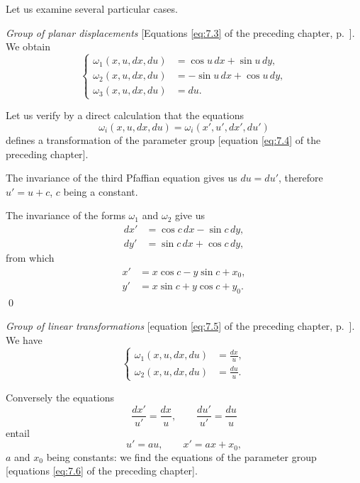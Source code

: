 \documentclass[leqno,11pt]{book}
\numberwithin{equation}{chapter}
\theoremstyle{shape1}
\theoremstyle{shapesmall}
\newcommand{\somespace}{\vspace{9pt}}
\begin{document}
{\small

Let us examine several particular cases.

\somespace

\emph{Group of planar displacements} [Equations \eqref{eq:7.3} of the preceding chapter, p.~\pageref{eq:7.3}]. We obtain
\begin{equation}
  \label{eq:8.7}
  \left\{
    \begin{aligned}
      \omega_{1}(x,u,dx,du)&=\cos u\,dx+\sin u\,dy,\\
      \omega_{2}(x,u,dx,du)&=-\sin u\,dx+\cos u\,dy,\\
      \omega_{3}(x,u,dx,du)&=du.
    \end{aligned}
  \right.
\end{equation}

Let us verify by a direct calculation that the equations
\[
\omega_{i}(x,u,dx,du)=\omega_{i}(x',u',dx',du')
\]
defines a transformation of the parameter group [equation \eqref{eq:7.4} of the preceding chapter].

The invariance of the third Pfaffian equation gives us $du=du'$, therefore $u'=u+c$, $c$ being a constant.

The invariance of the forms $\omega_{1}$ and $\omega_{2}$ give us
\begin{align*}
  dx'&=\cos c\,dx-\sin c\,dy,\\
  dy'&=\sin c\,dx+\cos c\,dy,
\end{align*}
from which
\begin{align*}
  x'&=x\cos c-y\sin c+x_{0},\\
  y'&=x\sin c+y\cos c+y_{0}.
\end{align*}
\qed

\somespace

\emph{Group of linear transformations} [equation \eqref{eq:7.5} of the preceding chapter, p.~\pageref{eq:7.5}]. We have
\begin{equation}
  \label{eq:8.8}
  \left\{
    \begin{aligned}
      \omega_{1}(x,u,dx,du)&=\frac{dx}{u},\\
      \omega_{2}(x,u,dx,du)&=\frac{du}{u}.
    \end{aligned}
  \right.
\end{equation}

Conversely the equations
\[
\frac{dx'}{u'}=\frac{dx}{u},\qquad\frac{du'}{u'}=\frac{du}{u}
\]
entail
\[
u'=au,\qquad x'=ax+x_{0},
\]
$a$ and $x_{0}$ being constants: we find the equations of the parameter group [equations \eqref{eq:7.6} of the preceding chapter].

}
\end{document}
